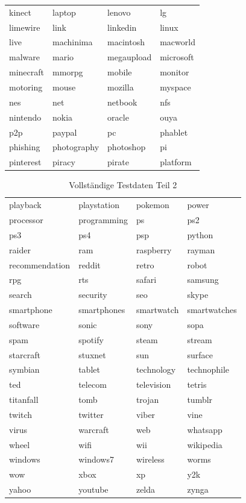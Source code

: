 \documentclass[12pt,a4paper]{report}
\begin{document}
\begin{table}[H]
\begin{center}
\begin{tabular}{l|l|l|l}
kinect & laptop & lenovo & lg\\
limewire & link & linkedin & linux\\
live & machinima & macintosh & macworld\\
malware & mario & megaupload & microsoft\\
minecraft & mmorpg & mobile & monitor\\
motoring & mouse & mozilla & myspace\\
nes & net & netbook & nfs\\
nintendo & nokia & oracle & ouya\\
p2p & paypal & pc & phablet\\
phishing & photography & photoshop & pi\\
pinterest & piracy & pirate & platform\\

\end{tabular}
\end{center}
\end{table}

\newpage
\begin{table}[H]
\caption{Vollständige Testdaten Teil 2}
\begin{center}
\begin{tabular}{l|l|l|l}\\
playback & playstation & pokemon & power\\
processor & programming & ps & ps2\\
ps3 & ps4 & psp & python\\
raider & ram & raspberry & rayman\\
recommendation & reddit & retro & robot\\
rpg & rts & safari & samsung\\
search & security & seo & skype\\
smartphone & smartphones & smartwatch & smartwatches\\
software & sonic & sony & sopa\\
spam & spotify & steam & stream\\
starcraft & stuxnet & sun & surface\\
symbian & tablet & technology & technophile\\
ted & telecom & television & tetris\\
titanfall & tomb & trojan & tumblr\\
twitch & twitter & viber & vine\\
virus & warcraft & web & whatsapp\\
wheel & wifi & wii & wikipedia\\
windows & windows7 & wireless & worms\\
wow & xbox & xp & y2k\\
yahoo & youtube & zelda & zynga\\

\end{tabular}
\end{center}
\end{table}
\end{document}
